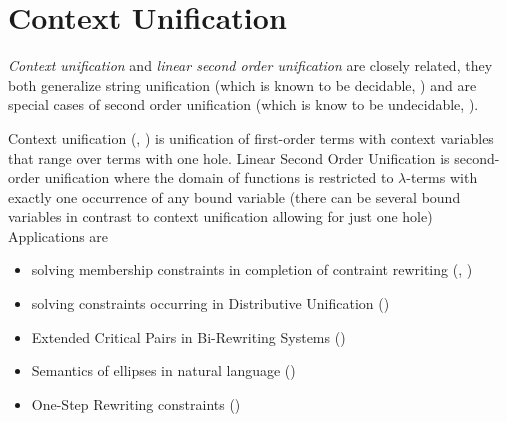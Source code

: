 \documentclass[11pt]{article}
\begin{document}
\setlength{\parskip}{6pt}
\setlength{\parindent}{0pt}

\section*{Context Unification}

\begin{abstract}
Are {\em context unification} and
{\em linear second order unification} decidable?
\end{abstract}

{\em Context unification} and {\em linear second order unification}
are closely related, they both generalize string unification
(which is known to be decidable, \cite{Makanin:77})
and are special cases of second order unification
(which is know to be undecidable, \cite{Goldfarb:tcs81}).

Context unification (\cite{Comon:rr699}, \cite{Schauss:rr94-12}) is
unification of first-order terms with context variables that range
over terms with one hole. 
Linear Second Order Unification is second-order unification where
the domain of functions is restricted to $\lambda$-terms with exactly
one occurrence of any bound variable (there can be several bound variables
in contrast to context unification allowing for just one hole)
Applications are
\begin{itemize}
\item solving membership constraints in completion of contraint rewriting
        (\cite{Comon:rr699}, \cite{Comon:icalp92})
\item solving constraints occurring in Distributive Unification
        (\cite{schmidt-schauss:jsc97})
\item Extended Critical Pairs in Bi-Rewriting Systems
        (\cite{LevyAgust:jsc96})
\item Semantics of ellipses in natural language
        (\cite{Niehren:cade97})
\item One-Step Rewriting constraints
        (\cite{Niehren:cade97})
\end{itemize}
\end{document}
